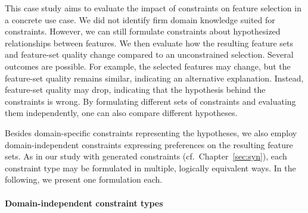 This case study aims to evaluate the impact of constraints on feature selection in a concrete use case.
We did not identify firm domain knowledge suited for constraints.
However, we can still formulate constraints about hypothesized relationships between features.
We then evaluate how the resulting feature sets and feature-set quality change compared to an unconstrained selection.
Several outcomes are possible.
For example, the selected features may change, but the feature-set quality remains similar, indicating an alternative explanation.
Instead, feature-set quality may drop, indicating that the hypothesis behind the constraints is wrong.
By formulating different sets of constraints and evaluating them independently, one can also compare different hypotheses.

Besides domain-specific constraints representing the hypotheses, we also employ domain-independent constraints expressing preferences on the resulting feature sets.
As in our study with generated constraints (cf.~Chapter~\ref{sec:syn}), each constraint type may be formulated in multiple, logically equivalent ways.
In the following, we present one formulation each.

\paragraph{Domain-independent constraint types}

